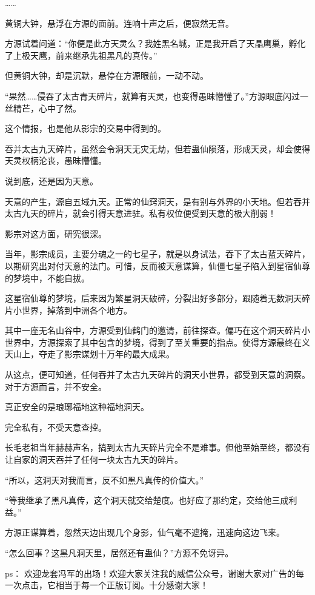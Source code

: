 \begin{this_body}
……

黄铜大钟，悬浮在方源的面前。连响十声之后，便寂然无音。

方源试着问道：“你便是此方天灵么？我姓黑名城，正是我开启了天晶鹰巢，孵化了上极天鹰，前来继承先祖黑凡的真传。”

但黄铜大钟，却是沉默，悬停在方源眼前，一动不动。

“果然……侵吞了太古青天碎片，就算有天灵，也变得愚昧懵懂了。”方源眼底闪过一丝精芒，心中了然。

这个情报，也是他从影宗的交易中得到的。

吞并太古九天碎片，虽然会令洞天无灾无劫，但若蛊仙陨落，形成天灵，却会使得天灵权柄沦丧，愚昧懵懂。

说到底，还是因为天意。

天意的产生，源自五域九天。正常的仙窍洞天，是有别与外界的小天地。但若吞并太古九天的碎片，就会引得天意进驻。私有权位便受到天意的极大削弱！

影宗对这方面，研究很深。

当年，影宗成员，主要分魂之一的七星子，就是以身试法，吞下了太古蓝天碎片，以期研究出对付天意的法门。可惜，反而被天意谋算，仙僵七星子陷入到星宿仙尊的梦境中，不能自拔。

这星宿仙尊的梦境，后来因为繁星洞天破碎，分裂出好多部分，跟随着无数洞天碎片小世界，掉落到中洲各个地方。

其中一座无名山谷中，方源受到仙鹤门的邀请，前往探查。偏巧在这个洞天碎片小世界中，方源探索了其中包含的梦境，得到了至关重要的指点。使得方源最终在义天山上，夺走了影宗谋划十万年的最大成果。

从这点，便可知道，任何吞并了太古九天碎片的洞天小世界，都受到天意的洞察。对于方源而言，并不安全。

真正安全的是琅琊福地这种福地洞天。

完全私有，不受天意查控。

长毛老祖当年赫赫声名，搞到太古九天碎片完全不是难事。但他至始至终，都没有让自家的洞天吞并了任何一块太古九天的碎片。

“所以，这洞天对我而言，反不如黑凡真传的价值大。”

“等我继承了黑凡真传，这个洞天就交给楚度。也好应了那约定，交给他三成利益。”

方源正谋算着，忽然天边出现几个身影，仙气毫不遮掩，迅速向这边飞来。

“怎么回事？这黑凡洞天里，居然还有蛊仙？”方源不免讶异。

ps：    欢迎龙套冯军的出场！欢迎大家关注我的威信公众号，谢谢大家对广告的每一次点击，它相当于每一个正版订阅。十分感谢大家！

\end{this_body}

